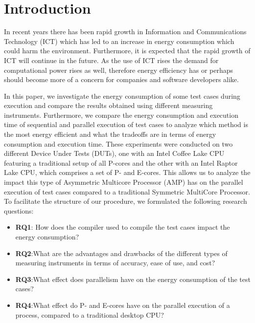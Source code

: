 \section{Introduction}

In recent years there has been rapid growth in Information and Communications Technology (ICT) which has led to an increase in energy consumption which could harm the environment. Furthermore, it is expected that the rapid growth of ICT will continue in the future. \cite{jones2018stop,andrae2015global} As the use of ICT rises the demand for computational power rises as well, therefore energy efficiency has or perhaps should become more of a concern for companies and software developers alike.

In this paper, we investigate the energy consumption of some test cases during execution and compare the results obtained using different measuring instruments. Furthermore, we compare the energy consumption and execution time of sequential and parallel execution of test cases to analyze which method is the most energy efficient and what the tradeoffs are in terms of energy consumption and execution time. These experiments were conducted on two different Device Under Tests (DUTs), one with an Intel Coffee Lake CPU featuring a traditional setup of all P-cores and the other with an Intel Raptor Lake CPU, which comprises a set of P- and E-cores. This allows us to analyze the impact this type of Asymmetric Multicore Processor (AMP) has on the parallel execution of test cases compared to a traditional Symmetric MultiCore Processor. To facilitate the structure of our procedure, we formulated the following research questions:

\begin{itemize}
    \item \textbf{RQ1}: How does the compiler used to compile the test cases impact the energy consumption?
    \item \textbf{RQ2}:What are the advantages and drawbacks of the different types of measuring instruments in terms of accuracy, ease of use, and cost?
    \item \textbf{RQ3}:What effect does parallelism have on the energy consumption of the test cases?
    \item \textbf{RQ4}:What effect do P- and E-cores have on the parallel execution of a process, compared to a traditional desktop CPU?
\end{itemize}

